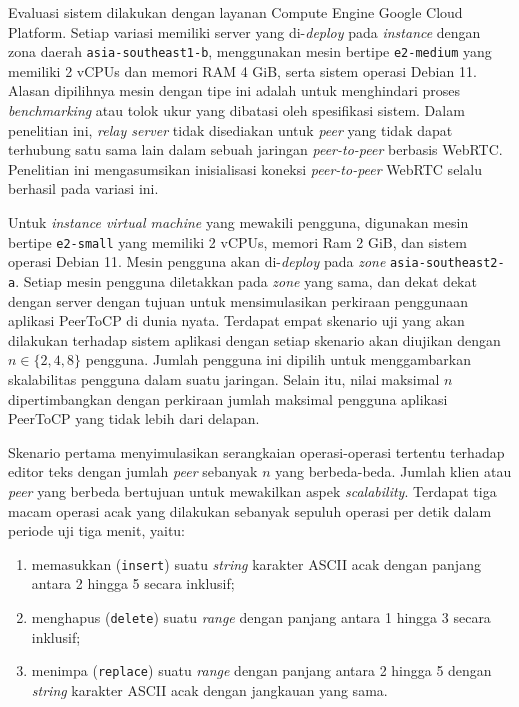 Evaluasi sistem dilakukan dengan layanan Compute Engine Google Cloud Platform. Setiap variasi memiliki server yang di-\textit{deploy} pada \textit{instance} dengan zona daerah \texttt{asia-southeast1-b}, menggunakan mesin bertipe \texttt{e2-medium} yang memiliki 2 vCPUs dan memori RAM 4 GiB, serta sistem operasi Debian 11. Alasan dipilihnya mesin dengan tipe ini adalah untuk menghindari proses \textit{benchmarking} atau tolok ukur yang dibatasi oleh spesifikasi sistem. Dalam penelitian ini, \textit{relay server} tidak disediakan untuk \textit{peer} yang tidak dapat terhubung satu sama lain dalam sebuah jaringan \textit{peer-to-peer} berbasis WebRTC. Penelitian ini mengasumsikan inisialisasi koneksi \textit{peer-to-peer} WebRTC selalu berhasil pada variasi ini.

Untuk \textit{instance virtual machine} yang mewakili pengguna, digunakan mesin bertipe \texttt{e2-small} yang memiliki 2 vCPUs, memori Ram 2 GiB, dan sistem operasi Debian 11. Mesin pengguna akan di-\textit{deploy} pada \textit{zone} \texttt{asia-southeast2-a}. Setiap mesin pengguna diletakkan pada \textit{zone} yang sama, dan dekat dekat dengan server dengan tujuan untuk mensimulasikan perkiraan penggunaan aplikasi PeerToCP di dunia nyata. Terdapat empat skenario uji yang akan dilakukan terhadap sistem aplikasi dengan setiap skenario akan diujikan dengan $n \in \{2, 4, 8\}$ pengguna. Jumlah pengguna ini dipilih untuk menggambarkan skalabilitas pengguna dalam suatu jaringan. Selain itu, nilai maksimal $n$ dipertimbangkan dengan perkiraan jumlah maksimal pengguna aplikasi PeerToCP yang tidak lebih dari delapan.

Skenario pertama menyimulasikan serangkaian operasi-operasi tertentu terhadap editor teks dengan jumlah \textit{peer} sebanyak $n$ yang berbeda-beda. Jumlah klien atau \textit{peer} yang berbeda bertujuan untuk mewakilkan aspek \textit{scalability}. Terdapat tiga macam operasi acak yang dilakukan sebanyak sepuluh operasi per detik dalam periode uji tiga menit, yaitu:

\begin{enumerate}[nolistsep]
    \item memasukkan (\texttt{insert}) suatu \textit{string} karakter ASCII acak dengan panjang antara 2 hingga 5 secara inklusif;
    \item menghapus (\texttt{delete}) suatu \textit{range} dengan panjang antara 1 hingga 3 secara inklusif;
    \item menimpa (\texttt{replace}) suatu \textit{range} dengan panjang antara 2 hingga 5 dengan \textit{string} karakter ASCII acak dengan jangkauan yang sama.
\end{enumerate}

